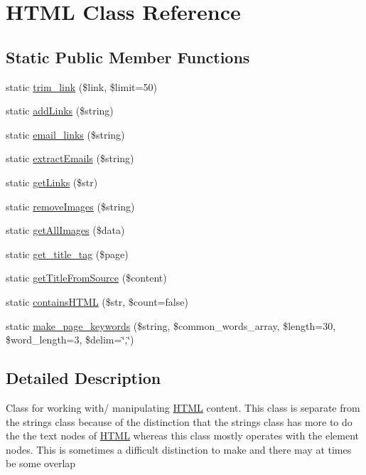 \hypertarget{class_h_t_m_l}{\section{H\-T\-M\-L Class Reference}
\label{class_h_t_m_l}
}
\subsection*{Static Public Member Functions}
\begin{DoxyCompactItemize}
\item 
static \hyperlink{class_h_t_m_l_a1e9922fb2649f9daec7e6f6aa175b513}{trim\-\_\-link} (\$link, \$limit=50)
\item 
static \hyperlink{class_h_t_m_l_a4b790d727e0af073c9c2ac8a6e61e7f5}{add\-Links} (\$string)
\item 
static \hyperlink{class_h_t_m_l_a57f0036fe5c8f936509dfae0db8dfe1e}{email\-\_\-links} (\$string)
\item 
static \hyperlink{class_h_t_m_l_a50b9ae86bef1a3cc3dc3db0b5ddbe1f4}{extract\-Emails} (\$string)
\item 
static \hyperlink{class_h_t_m_l_a5d1e7d37a08bafd7d104f93df392b745}{get\-Links} (\$str)
\item 
static \hyperlink{class_h_t_m_l_ab415e22bfd0c559f285fdb798540ca04}{remove\-Images} (\$string)
\item 
static \hyperlink{class_h_t_m_l_ac5b3824500995287210d55f50c86407f}{get\-All\-Images} (\$data)
\item 
static \hyperlink{class_h_t_m_l_a91e29d92c34a75a1f1e662a4a22ca023}{get\-\_\-title\-\_\-tag} (\$page)
\item 
static \hyperlink{class_h_t_m_l_aec680be0c9763f9e5d1526a22b0848f7}{get\-Title\-From\-Source} (\$content)
\item 
static \hyperlink{class_h_t_m_l_adb257193ff7faa59c1720210b77ecf49}{contains\-H\-T\-M\-L} (\$str, \$count=false)
\item 
static \hyperlink{class_h_t_m_l_a84b1d11966a91441133d817e58bdf0bb}{make\-\_\-page\-\_\-keywords} (\$string, \$common\-\_\-words\-\_\-array, \$length=30, \$word\-\_\-length=3, \$delim=\char`\"{},\char`\"{})
\end{DoxyCompactItemize}


\subsection{Detailed Description}
Class for working with/ manipulating \hyperlink{class_h_t_m_l}{H\-T\-M\-L} content. This class is separate from the strings class because of the distinction that the strings class has more to do the the text nodes of \hyperlink{class_h_t_m_l}{H\-T\-M\-L} whereas this class mostly operates with the element nodes. This is sometimes a difficult distinction to make and there may at times be some overlap 

